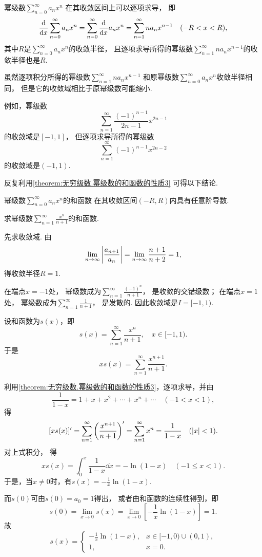 \begin{property}\label{theorem:无穷级数.幂级数的和函数的性质3}
幂级数\(\sum_{n=0}^\infty a_n x^n\)
在其收敛区间上可以逐项求导，
即\begin{equation}
	\dv{x} \sum_{n=0}^\infty a_n x^n
	= \sum_{n=0}^\infty \dv{x} a_n x^n
	= \sum_{n=1}^\infty n a_n x^{n-1}
	\quad(-R<x<R),
\end{equation}
其中\(R\)是\(\sum_{n=0}^\infty a_n x^n\)的收敛半径，
且逐项求导所得的幂级数\(\sum_{n=1}^\infty n a_n x^{n-1}\)的收敛半径也是\(R\).
\end{property}
\begin{remark}
虽然逐项积分所得的幂级数\(\sum_{n=1}^\infty n a_n x^{n-1}\)
和原幂级数\(\sum_{n=0}^\infty a_n x^n\)收敛半径相同，
但是它的收敛域相比于原幂级数可能缩小.

例如，幂级数\[
	\sum_{n=1}^\infty \frac{(-1)^{n-1}}{2n-1} x^{2n-1}
\]的收敛域是\([-1,1]\)，
但逐项求导所得的幂级数\[
	\sum_{n=1}^\infty (-1)^{n-1} x^{2n-2}
\]的收敛域是\((-1,1)\).
\end{remark}

反复利用\cref{theorem:无穷级数.幂级数的和函数的性质3} 可得以下结论.
\begin{proposition}
幂级数\(\sum_{n=0}^\infty a_n x^n\)的和函数
在其收敛区间\((-R,R)\)内具有任意阶导数.
\end{proposition}

\begin{example}
求幂级数\(\sum_{n=1}^\infty \frac{x^n}{n+1}\)的和函数.
\begin{solution}
先求收敛域.
由\[
	\lim_{n\to\infty} \abs{\frac{a_{n+1}}{a_n}}
	= \lim_{n\to\infty} \frac{n+1}{n+2}
	= 1,
\]
得收敛半径\(R=1\).

在端点\(x = -1\)处，
幂级数成为\(\sum_{n=1}^\infty \frac{(-1)^n}{n+1}\)，
是收敛的交错级数；
在端点\(x = 1\)处，
幂级数成为\(\sum_{n=1}^\infty \frac{1}{n+1}\)，
是发散的.
因此收敛域是\(I = [-1,1)\).

设和函数为\(s(x)\)，即\[
	s(x) = \sum_{n=1}^\infty \frac{x^n}{n+1},
	\quad x\in[-1,1).
\]
于是\[
	x s(x) = \sum_{n=1}^\infty \frac{x^{n+1}}{n+1}.
\]

利用\cref{theorem:无穷级数.幂级数的和函数的性质3}，逐项求导，并由\[
	\frac{1}{1-x} = 1+x+x^2+\dotsb+x^n+\dotsb
	\quad(-1<x<1),
\]
得\[
	[x s(x)]'
	= \sum_{n=1}^\infty \left( \frac{x^{n+1}}{n+1} \right)'
	= \sum_{n=1}^\infty x^n
	= \frac{1}{1-x}
	\quad(\abs{x}<1).
\]
对上式积分，
得\[
	x s(x) = \int_0^x \frac{1}{1-x} \dd{x} = -\ln(1-x)
	\quad(-1 \leq x < 1).
\]
于是，当\(x\neq0\)时，有\(s(x) = -\frac{1}{x} \ln(1-x)\).

而\(s(0)\)可由\(s(0) = a_0 = 1\)得出，
或者由和函数的连续性得到，即\[
	s(0)
	= \lim_{x\to0} s(x)
	= \lim_{x\to0} \left[ -\frac{1}{x} \ln(1-x) \right]
	= 1.
\]
故\[
	s(x) = \left\{ \begin{array}{cl}
		-\frac{1}{x} \ln(1-x), & x\in[-1,0)\cup(0,1), \\
		1, & x=0.
	\end{array} \right.
\]
\end{solution}
\end{example}





